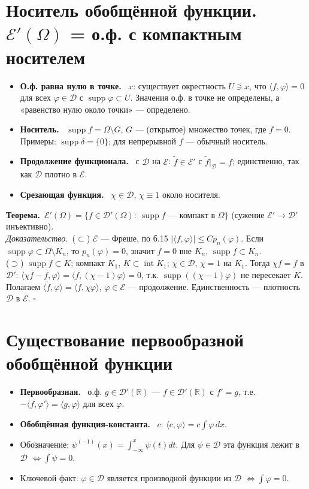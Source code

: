 \documentclass[11pt,a4paper]{article}
\newcommand{\RR}{\mathbb R}
\newcommand{\DD}{\mathcal D}
\newcommand{\EE}{\mathcal E}
\newcommand{\supp}{\operatorname{supp}}
\newcommand{\df}[1]{\textbf{#1.}~}
\newcommand{\thm}{\textbf{Теорема.}~}
\newcommand{\pf}{\textit{Доказательство.}~}
\newcommand{\qedd}{\hfill$\square$}
\begin{document}
\section{Носитель обобщённой функции. $\EE'(\Omega)$ = о.ф. с компактным носителем}
\begin{defs}
\begin{itemize}
\item \df{О.ф. равна нулю в точке} $x$: существует окрестность $U\ni x$, что $\langle f,\varphi\rangle=0$ для всех $\varphi\in\DD$ с $\supp\varphi\subset U$. Значения о.ф. в точке не определены, а «равенство нулю около точки» — определено.
\item \df{Носитель} $\supp f=\Omega\setminus G$, $G$ — (открытое) множество точек, где $f=0$. Примеры: $\supp\delta=\{0\}$; для непрерывной $f$ — обычный носитель.
\item \df{Продолжение функционала} с $\DD$ на $\EE$: $\tilde f\in\EE'$ с $\tilde f|_\DD=f$; единственно, так как $\DD$ плотно в $\EE$.
\item \df{Срезающая функция} $\chi\in\DD$, $\chi\equiv1$ около носителя.
\end{itemize}
\end{defs}

\thm $\EE'(\Omega)=\{f\in\DD'(\Omega):\ \supp f$ — компакт в $\Omega\}$ (сужение $\EE'\to\DD'$ инъективно).\\
\pf ($\subset$) $\EE$ — Фреше, по б.15 $|\langle f,\varphi\rangle|\le Cp_n(\varphi)$. Если $\supp\varphi\subset\Omega\setminus K_n$, то $p_n(\varphi)=0$, значит $f=0$ вне $K_n$, $\supp f\subset K_n$.\\
($\supset$) $\supp f\subset K$; компакт $K_1$, $K\subset\operatorname{int}K_1$; $\chi\in\DD$, $\chi=1$ на $K_1$. Тогда $\chi f=f$ в $\DD'$: $\langle\chi f-f,\varphi\rangle=\langle f,(\chi-1)\varphi\rangle=0$, т.к. $\supp((\chi-1)\varphi)$ не пересекает $K$. Полагаем $\langle\tilde f,\varphi\rangle=\langle f,\chi\varphi\rangle$, $\varphi\in\EE$ — продолжение. Единственность — плотность $\DD$ в $\EE$. \qedd

\section{Существование первообразной обобщённой функции}
\begin{defs}
\begin{itemize}
\item \df{Первообразная} о.ф. $g\in\DD'(\RR)$ — $f\in\DD'(\RR)$ с $f'=g$, т.е. $-\langle f,\varphi'\rangle=\langle g,\varphi\rangle$ для всех $\varphi$.
\item \df{Обобщённая функция-константа} $c$: $\langle c,\varphi\rangle=c\int\varphi\,dx$.
\item Обозначение: $\psi^{(-1)}(x)=\int_{-\infty}^x\psi(t)dt$. Для $\psi\in\DD$ эта функция лежит в $\DD$ $\iff\int\psi=0$.
\item Ключевой факт: $\varphi\in\DD$ является производной функции из $\DD$ $\iff\int\varphi=0$.
\end{itemize}
\end{defs}
\end{document}
